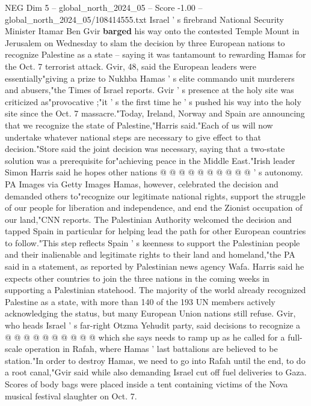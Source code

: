 \begin{textsample}{NEG Dim 5 – global\_north\_2024\_05 – Score -1.00 – global\_north\_2024\_05/108414555.txt}  \label{ex:f5_neg_283}
Israel ' s firebrand National Security Minister Itamar Ben Gvir \textbf{barged} his way onto the contested Temple Mount in Jerusalem on Wednesday to slam the decision by three European nations to recognize Palestine as a state -- saying it was tantamount to rewarding Hamas for the Oct. 7 terrorist attack.
Gvir, 48, said the European leaders were essentially"giving a prize to Nukhba Hamas ' s elite commando unit murderers and abusers,"the Times of Israel reports.
Gvir ' s presence at the holy site was criticized as"provocative ;"it ' s the first time he ' s pushed his way into the holy site since the Oct. 7 massacre."Today, Ireland, Norway and Spain are announcing that we recognize the state of Palestine,"Harris said."Each of us will now undertake whatever national steps are necessary to give effect to that decision."Store said the joint decision was necessary, saying that a two-state solution was a prerequisite for"achieving peace in the Middle East."Irish leader Simon Harris said he hopes other nations @ @ @ @ @ @ @ @ @ @ ' s autonomy.
PA Images via Getty Images Hamas, however, celebrated the decision and demanded others to"recognize our legitimate national rights, support the struggle of our people for liberation and independence, and end the Zionist occupation of our land,"CNN reports.
The Palestinian Authority welcomed the decision and tapped Spain in particular for helping lead the path for other European countries to follow."This step reflects Spain ' s keenness to support the Palestinian people and their inalienable and legitimate rights to their land and homeland,"the PA said in a statement, as reported by Palestinian news agency Wafa.
Harris said he expects other countries to join the three nations in the coming weeks in supporting a Palestinian statehood.
The majority of the world already recognized Palestine as a state, with more than 140 of the 193 UN members actively acknowledging the status, but many European Union nations still refuse.
Gvir, who heads Israel ' s far-right Otzma Yehudit party, said decisions to recognize a @ @ @ @ @ @ @ @ @ @ which she says needs to ramp up as he called for a full-scale operation in Rafah, where Hamas ' last battalions are believed to be station."In order to destroy Hamas, we need to go into Rafah until the end, to do a root canal,"Gvir said while also demanding Israel cut off fuel deliveries to Gaza.
Scores of body bags were placed inside a tent containing victims of the Nova musical festival slaughter on Oct. 7.

\end{textsample}
